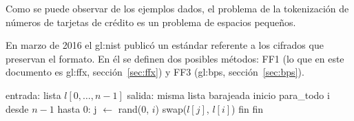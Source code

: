 Como se puede observar de los ejemplos dados, el problema de la tokenización
de números de tarjetas de crédito es un problema de espacios pequeños.

En marzo de 2016 el \gls{gl:nist} publicó un estándar referente a los cifrados
que preservan el formato\cite{nist_fpe}. En él se definen dos posibles métodos:
FF1 (lo que en este documento es \gls{gl:ffx}, sección~\ref{sec:ffx}) y FF3
(\gls{gl:bps}, sección~\ref{sec:bps}).

\begin{pseudocodigo}[%
  caption={\textit{Knuth shuffle},~\cite{DBLP:books/aw/Knuth69}.},
  label={knuth_shuffle}%
]
    entrada: lista $ l[0, \dots, n - 1] $
    salida:  misma lista barajeada
    inicio
      para_todo i desde $ n - 1 $ hasta 0:
        j $ \gets $ rand($ 0 $, $ i $)
        swap($ l[j] $, $ l[i] $)
      fin
    fin
\end{pseudocodigo}
